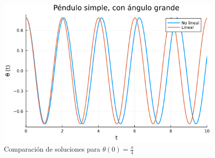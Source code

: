 \begin{ex}
    \begin{figure}[H]
        \centering
        \includegraphics[width=1.0\textwidth]{img/big.png}
        \caption{Comparación de soluciones para $\theta(0) = \frac{\pi}{4}$}
        \label{fig:pendulo_sol_big}
    \end{figure}


\end{ex}


